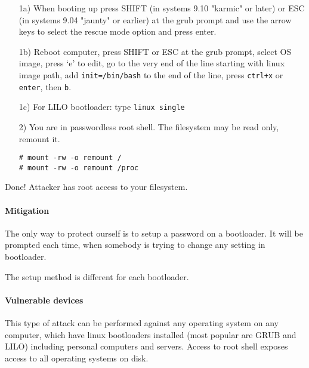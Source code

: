 \begin{enumerate}
    \item[1a)] When booting up press SHIFT (in systems 9.10 "karmic" or later) or ESC (in systems 9.04 "jaunty" or earlier) at the grub prompt and use the arrow keys to select the rescue mode option and press enter. 

    \item[1b)] Reboot computer, press SHIFT or ESC at the grub prompt, select OS image, press `e' to edit, go to the very end of the line starting with linux image path, add \texttt{init=/bin/bash} to the end of the line, press \texttt{ctrl+x} or \texttt{enter}, then \texttt{b}.

    \item[1c)] For LILO bootloader: type \verb|linux single|

    \item[2)] You are in passwordless root shell. The filesystem may be read only, remount it.

\begin{lstlisting}
# mount -rw -o remount /
# mount -rw -o remount /proc
\end{lstlisting}

\end{enumerate}

Done! Attacker has root access to your filesystem.


\paragraph*{Mitigation}
The only way to protect ourself is to setup a password on a bootloader. It will be prompted each time, when somebody is trying to change any setting in bootloader. 

The setup method is different for each bootloader.

\paragraph*{Vulnerable devices}
This type of attack can be performed against any operating system on any computer, which have linux bootloaders installed (most popular are GRUB and LILO) including personal computers and servers. Access to root shell exposes access to all operating systems on disk.


